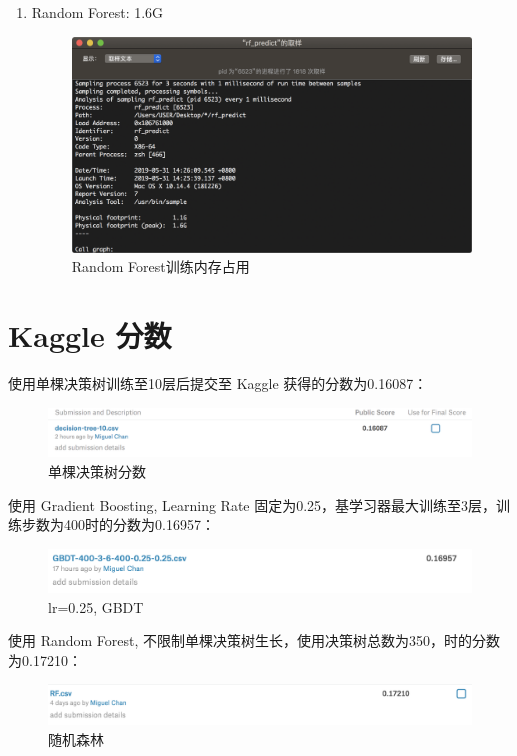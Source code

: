 \documentclass[12pt]{article}
\begin{document}
\begin{enumerate}
    \item Random Forest: 1.6G
    \begin{figure}[H]
        \centering
        \includegraphics[scale=0.44]{rf-memory.png}
        \caption{Random Forest训练内存占用}
        \label{}
    \end{figure}
\end{enumerate}

\section{Kaggle 分数}

使用单棵决策树训练至10层后提交至 Kaggle 获得的分数为0.16087：
\begin{figure}[H]
    \centering
    \includegraphics[scale=0.5]{single-tree-300-10-kaggle.png}
    \caption{单棵决策树分数}
    \label{}
\end{figure}

使用 Gradient Boosting, Learning Rate 固定为0.25，基学习器最大训练至3层，训练步数为400时的分数为0.16957：
\begin{figure}[H]
    \centering
    \includegraphics[scale=0.5]{gbdt-fixed-lr-kaggle.png}
    \caption{lr=0.25, GBDT}
    \label{}
\end{figure}

使用 Random Forest, 不限制单棵决策树生长，使用决策树总数为350，时的分数为0.17210：
\begin{figure}[H]
    \centering
    \includegraphics[scale=0.5]{RF-400-4-005-350.png}
    \caption{随机森林}
    \label{}
\end{figure}



\end{document}
